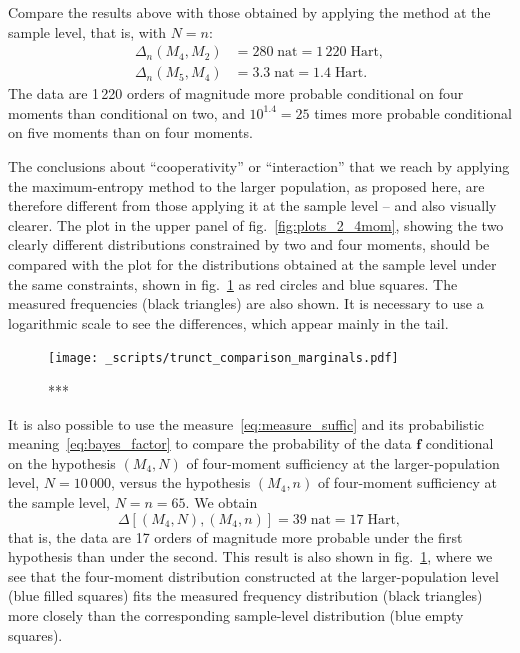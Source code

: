 \documentclass[\ifafour a4paper,12pt,\else a5paper,10pt,\fi%
onecolumn,oneside,article,%
british%
]{memoir}
\theoremstyle{remark}
\theoremstyle{innote}
\renewcommand*{\|}{\nonscript\,\vert\nonscript\;\mathopen{}}
\newcommand*{\fig}{fig.}%
\newcommand*{\yff}{f}
\newcommand*{\yf}{\bm{\yff}}
\newcommand*{\ydi}{\varDelta}
\newcommand*{\nat}{\textrm{nat}}
\newcommand*{\hart}{\textrm{Hart}}
\begin{document}
\medskip

Compare the results above with those obtained by applying the method at the
sample level, that is, with $N=n$:
\begin{equation}
  \label{eq:diff_suff_n}
  \begin{split}
  \ydi_{n}(M_{4},M_{2}) &= 280\;\nat = 1\,220\;\hart,
\\    \ydi_{n}(M_{5},M_{4}) &= 3.3\;\nat = 1.4\;\hart.
\end{split}
\end{equation}
The data are 1\,220 orders of magnitude more probable conditional on four
moments than conditional on two, and $10^{1.4}=25$ times more probable
conditional on five moments than on four moments.

The conclusions about \enquote{cooperativity} or \enquote{interaction} that
we reach by applying the maximum-entropy method to the larger population,
as proposed here, are therefore different from those applying it at the
sample level -- and also visually clearer. The plot in the upper panel of
\fig~\ref{fig:plots_2_4mom}, showing the two clearly different
distributions constrained by two and four moments, should be compared with
the plot for the distributions obtained at the sample level under the same
constraints, shown in \fig~\ref{fig:comparisons_marginals} as
\textcolor{myred}{red circles} and \textcolor{myblue}{blue squares}. The
measured frequencies (black triangles) are also shown. It is necessary to
use a logarithmic scale to see the differences, which appear mainly in the
tail.
\begin{figure}[!p]
\centering
\texttt{[image: \_scripts/trunct\_comparison\_marginals.pdf]}%
\caption{***}
\label{fig:comparisons_marginals}
\end{figure}

\medskip


It is also possible to use the measure~\eqref{eq:measure_suffic} and its
probabilistic meaning~\eqref{eq:bayes_factor} to compare the probability of
the data $\yf$ conditional on the hypothesis $(M_{4},N)$ of four-moment
sufficiency at the larger-population level, $N=10\,000$, versus the
hypothesis $(M_{4}, n)$ of four-moment sufficiency at the sample level,
$N=n=65$. We obtain
\begin{equation}
  \label{eq:diff_suff_n}
  \ydi[(M_{4}, N), (M_{4}, n)] = 39\;\nat = 17\;\hart,
\end{equation}
that is, the data are 17 orders of magnitude more probable under the first
hypothesis than under the second. This result is also shown in
\fig~\ref{fig:comparisons_marginals}, where we see that the four-moment
distribution constructed at the larger-population level
(\textcolor{myblue}{blue filled squares}) fits the measured frequency
distribution (black triangles) more closely than the corresponding
sample-level distribution (\textcolor{myblue}{blue empty squares}).
\end{document}
